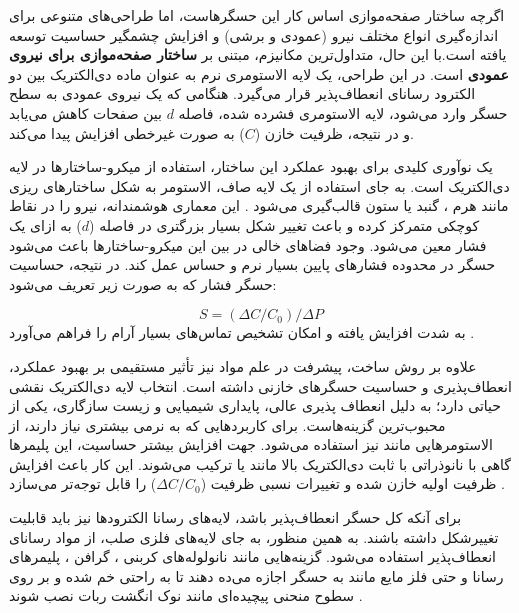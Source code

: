 اگرچه ساختار صفحه‌موازی اساس کار این حسگرهاست، اما طراحی‌های متنوعی برای اندازه‌گیری انواع مختلف نیرو (عمودی و برشی) و افزایش چشمگیر حساسیت توسعه یافته است.با این حال، متداول‌ترین مکانیزم، مبتنی بر \textbf{ساختار صفحه‌موازی برای نیروی عمودی} است. در این طراحی، یک لایه الاستومری نرم به عنوان ماده دی‌الکتریک بین دو الکترود رسانای انعطاف‌پذیر قرار می‌گیرد. هنگامی که یک نیروی عمودی به سطح حسگر وارد می‌شود، لایه الاستومری فشرده شده، فاصله $d$ بین صفحات کاهش می‌یابد و در نتیجه، ظرفیت خازن ($C$) به صورت غیرخطی افزایش پیدا می‌کند.

یک نوآوری کلیدی برای بهبود عملکرد این ساختار، استفاده از میکرو-ساختارها
 در لایه دی‌الکتریک است. به جای استفاده از یک لایه صاف، الاستومر به شکل ساختارهای ریزی مانند هرم
،
 گنبد 
  یا ستون
   قالب‌گیری می‌شود \cite{mannsfeld2010highly}. این معماری هوشمندانه، نیرو را در نقاط کوچکی متمرکز کرده و باعث تغییر شکل بسیار بزرگتری در فاصله ($d$) به ازای یک فشار معین می‌شود. وجود فضاهای خالی در بین این میکرو-ساختارها باعث می‌شود حسگر در محدوده فشارهای پایین بسیار نرم و حساس عمل کند. در نتیجه، حساسیت حسگر فشار که به صورت زیر تعریف می‌شود:
  
  \begin{equation}
  	S = (\Delta C/C_0)/\Delta P
  	\label{eq:sensC}
  \end{equation}
     به شدت افزایش یافته و امکان تشخیص تماس‌های بسیار آرام را فراهم می‌آورد \cite{zou2017novel}.

علاوه بر روش ساخت، پیشرفت در علم مواد نیز تأثیر مستقیمی بر بهبود عملکرد، انعطاف‌پذیری و حساسیت حسگرهای خازنی داشته است. انتخاب لایه دی‌الکتریک نقشی حیاتی دارد؛ 
 به دلیل انعطاف ‌پذیری عالی، پایداری شیمیایی و زیست ‌سازگاری، یکی از محبوب‌ترین گزینه‌هاست. برای کاربردهایی که به نرمی بیشتری نیاز دارند، از الاستومرهایی مانند
   نیز استفاده می‌شود. جهت افزایش بیشتر حساسیت، این پلیمرها گاهی با نانوذراتی با ثابت دی‌الکتریک بالا
  مانند
   
    یا 
       
     ترکیب می‌شوند. این کار باعث افزایش ظرفیت اولیه خازن شده و تغییرات نسبی ظرفیت ($\Delta C/C_0$) را قابل توجه‌تر می‌سازد \cite{zou2017novel}.
     
برای آنکه کل حسگر انعطاف‌پذیر باشد، لایه‌های رسانا الکترودها نیز باید قابلیت تغییرشکل داشته باشند. به همین منظور، به جای لایه‌های فلزی صلب، از مواد رسانای انعطاف‌پذیر استفاده می‌شود. گزینه‌هایی مانند نانولوله‌های کربنی
، 
 گرافن
 ، 
 پلیمرهای رسانا و حتی  فلز مایع مانند 
  به حسگر اجازه می‌ده دهند تا به راحتی خم شده و بر روی سطوح منحنی پیچیده‌ای مانند نوک انگشت  ربات نصب شوند \cite{chi2018recent}.


